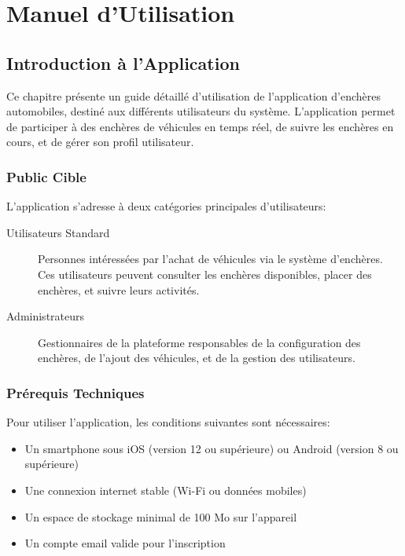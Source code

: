 \chapter{Manuel d'Utilisation}

\section{Introduction à l'Application}

Ce chapitre présente un guide détaillé d'utilisation de l'application d'enchères automobiles, destiné aux différents utilisateurs du système. L'application permet de participer à des enchères de véhicules en temps réel, de suivre les enchères en cours, et de gérer son profil utilisateur.

\subsection{Public Cible}

L'application s'adresse à deux catégories principales d'utilisateurs:

\begin{description}
    \item[Utilisateurs Standard] Personnes intéressées par l'achat de véhicules via le système d'enchères. Ces utilisateurs peuvent consulter les enchères disponibles, placer des enchères, et suivre leurs activités.
    \item[Administrateurs] Gestionnaires de la plateforme responsables de la configuration des enchères, de l'ajout des véhicules, et de la gestion des utilisateurs.
\end{description}

\subsection{Prérequis Techniques}

Pour utiliser l'application, les conditions suivantes sont nécessaires:

\begin{itemize}
    \item Un smartphone sous iOS (version 12 ou supérieure) ou Android (version 8 ou supérieure)
    \item Une connexion internet stable (Wi-Fi ou données mobiles)
    \item Un espace de stockage minimal de 100 Mo sur l'appareil
    \item Un compte email valide pour l'inscription
\end{itemize}

